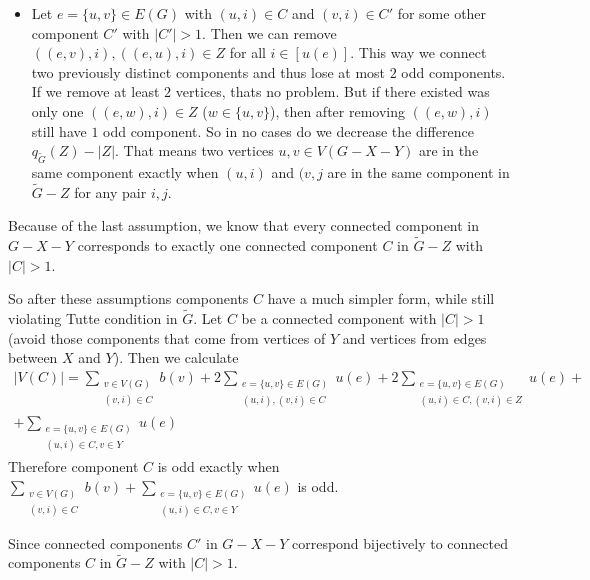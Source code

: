 \begin{exercise}{3}
\begin{itemize}
        \item{Let $e = \{u, v\} \in E(G)$ with $(u, i) \in C$ and $(v, i) \in
            C'$ for some other component $C'$ with $|C'| > 1$. Then we can
            remove $((e, v), i), ((e, u), i) \in Z$ for all $i \in [u(e)]$. This
            way we connect two previously distinct components and thus lose at
            most $2$ odd components. If we remove at least $2$ vertices, thats
            no problem. But if there existed was only one $((e, w), i) \in Z$
            ($w \in \{u, v\}$), then after removing $((e, w), i)$ still have $1$
            odd component. So in no cases do we decrease the difference
            $q_{\tilde{G}}(Z) - |Z|$. That means two vertices $u, v \in V(G - X
            - Y)$ are in the same component exactly when $(u, i)$ and $(v, j$
            are in the same component in $\tilde{G} - Z$ for any pair $i,j$.}
    \end{itemize}

    Because of the last assumption, we know that every connected component in
    $G - X - Y$ corresponds to exactly one connected component $C$ in $\tilde{G}
    - Z$ with $|C| > 1$.

    So after these assumptions components $C$ have a much simpler form, while
    still violating Tutte condition in $\tilde{G}$. Let $C$ be a connected
    component with $|C| > 1$ (avoid those components that come from vertices of $Y$
    and vertices from edges between $X$ and $Y$). Then we calculate
    \begin{multline*}
        |V(C)| = \sum_{\substack{v \in V(G)\\ (v, i) \in C}} b(v) + 2
        \sum_{\substack{e = \{u, v\} \in E(G)\\ (u, i), (v, i) \in C}} u(e) + 2
        \sum_{\substack{e = \{u, v\} \in E(G)\\ (u, i) \in C, (v, i) \in Z}}
        u(e) + \\
        + \sum_{\substack{e = \{u, v\} \in E(G)\\ (u, i) \in C, v \in Y}} u(e)
    \end{multline*}
    Therefore component $C$ is odd exactly when $\sum_{\substack{v \in V(G)\\
    (v, i) \in C}} b(v) + \sum_{\substack{e = \{u, v\} \in E(G)\\ (u, i) \in C,
    v \in Y}} u(e)$ is odd.

    Since connected components $C'$ in $G - X - Y$ correspond bijectively to
    connected components $C$ in $\tilde{G} - Z$ with $|C| > 1$.


\end{exercise}
